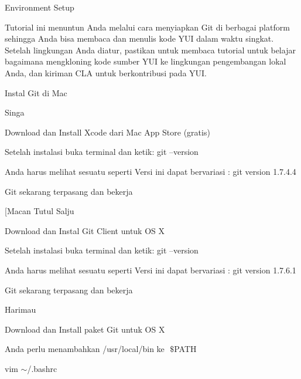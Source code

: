 \sloppy
\begin{center}Environment Setup\end{center} \par
\vspace{12pt}
\noindent 
Tutorial ini menuntun Anda melalui cara menyiapkan Git di berbagai platform sehingga Anda bisa membaca dan menulis kode YUI dalam waktu singkat. $  $Setelah lingkungan Anda diatur, pastikan untuk membaca tutorial $  $untuk belajar bagaimana mengkloning kode sumber YUI ke lingkungan pengembangan lokal Anda, dan kiriman CLA untuk berkontribusi pada YUI. \par
\vspace{12pt}
\noindent 
 $  $Instal Git di Mac \par
\vspace{12pt}
\noindent 
 $  $Singa \par
\vspace{12pt}
\noindent 
Download dan Install Xcode dari Mac App Store (gratis) \par
\noindent 
Setelah instalasi buka terminal dan ketik: $  $git --version \par
\noindent 
Anda harus melihat sesuatu seperti $  $Versi $  $ini $  $dapat bervariasi $  $: $  $git version 1.7.4.4 \par
\noindent 
Git sekarang terpasang dan bekerja \par
\vspace{12pt}
\noindent 
 $  $[Macan Tutul Salju \par
\vspace{12pt}
\noindent 
Download dan Instal Git Client untuk OS X  \par
\noindent 
Setelah instalasi buka terminal dan ketik: $  $git --version \par
\noindent 
Anda harus melihat sesuatu seperti $  $Versi $  $ini $  $dapat bervariasi $  $: $  $git version 1.7.6.1 \par
\noindent 
Git sekarang terpasang dan bekerja \par
\vspace{12pt}
\noindent 
 $  $Harimau \par
\vspace{12pt}
\noindent 
Download dan Install paket Git untuk OS X  \par
\noindent 
Anda perlu menambahkan $  $/usr/local/bin $  $ke $  $ $  \$  $PATH \par
\noindent 
vim  $  \sim  $/.bashrc \par
\vspace{12pt}
